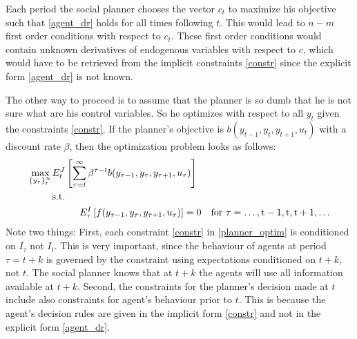 \documentclass[10pt]{article}
\begin{document}
Each period the social planner chooses the vector $c_t$ to maximize
his objective such that \eqref{agent_dr} holds for all times following
$t$. This would lead to $n-m$ first order conditions with respect to
$c_t$. These first order conditions would contain unknown derivatives
of endogenous variables with respect to $c$, which would have to be
retrieved from the implicit constraints \eqref{constr} since the
explicit form \eqref{agent_dr} is not known.

The other way to proceed is to assume that the planner is so dumb that
he is not sure what are his control variables. So he optimizes with
respect to all $y_t$ given the constraints \eqref{constr}. If the
planner's objective is $b(y_{t-1},y_t,y_{t+1},u_t)$ with a discount rate
$\beta$, then the optimization problem looks as follows:
\begin{align}
\max_{\left\{y_\tau\right\}^\infty_t}&E_t^J
\left[\sum_{\tau=t}^\infty\beta^{\tau-t}b(y_{\tau-1},y_\tau,y_{\tau+1},u_\tau)\right]\notag\\
&\rm{s.t.}\label{planner_optim}\\
&\hskip1cm E^I_\tau\left[f(y_{\tau-1},y_\tau,y_{\tau+1},u_\tau)\right]=0\quad\rm{for\ }
\tau=\ldots,t-1,t,t+1,\ldots\notag
\end{align}
Note two things: First, each constraint \eqref{constr} in
\eqref{planner_optim} is conditioned on $I_\tau$ not $I_t$. This is
very important, since the behaviour of agents at period $\tau=t+k$ is
governed by the constraint using expectations conditioned on $t+k$,
not $t$. The social planner knows that at $t+k$ the agents will use
all information available at $t+k$. Second, the constraints for the
planner's decision made at $t$ include also constraints for agent's
behaviour prior to $t$. This is because the agent's decision rules are
given in the implicit form \eqref{constr} and not in the explicit form
\eqref{agent_dr}.
\end{document}
